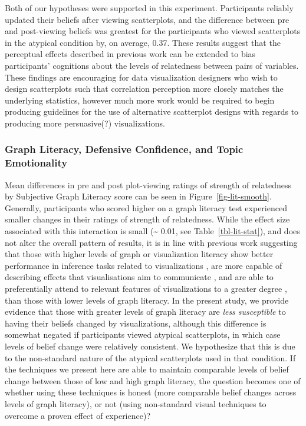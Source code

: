 \documentclass[manuscript,screen,review,anonymous]{acmart}
\begin{document}
Both of our hypotheses were supported in this experiment. Participants
reliably updated their beliefs after viewing scatterplots, and the
difference between pre and post-viewing beliefs was greatest for the
participants who viewed scatterplots in the atypical condition by, on
average, 0.37. These results suggest that the perceptual effects
described in previous work can be extended to bias participants'
cognitions about the levels of relatedness between pairs of variables.
These findings are encouraging for data visualization designers who wish
to design scatterplots such that correlation perception more closely
matches the underlying statistics, however much more work would be
required to begin producing guidelines for the use of alternative
scatterplot designs with regards to producing more persuasive(?)
visualizations.

\subsubsection{Graph Literacy, Defensive Confidence, and Topic
Emotionality}\label{sec-add-analyses-discussion}

Mean differences in pre and post plot-viewing ratings of strength of
relatedness by Subjective Graph Literacy score can be seen in
Figure~\ref{fig-lit-smooth}. Generally, participants who scored higher
on a graph literacy test experienced smaller changes in their ratings of
strength of relatedness. While the effect size associated with this
interaction is small (\textasciitilde{} 0.01, see
Table~\ref{tbl-lit-stat}), and does not alter the overall pattern of
results, it is in line with previous work suggesting that those with
higher levels of graph or visualization literacy show better performance
in inference tasks related to visualizations \citep{canham_2010}, are
more capable of describing effects that visualisations aim to
communicate \citep{shah_2011}, and are able to preferentially attend to
relevant features of visualizations to a greater degree
\citep{okan_2016}, than those with lower levels of graph literacy. In
the present study, we provide evidence that those with greater levels of
graph literacy are \emph{less susceptible} to having their beliefs
changed by visualizations, although this difference is somewhat negated
if participants viewed atypical scatterplots, in which case levels of
belief change were relatively consistent. We hypothesize that this is
due to the non-standard nature of the atypical scatterplots used in that
condition. If the techniques we present here are able to maintain
comparable levels of belief change between those of low and high graph
literacy, the question becomes one of whether using these techniques is
honest (more comparable belief changes across levels of graph literacy),
or not (using non-standard visual techniques to overcome a proven effect
of experience)?
\end{document}
